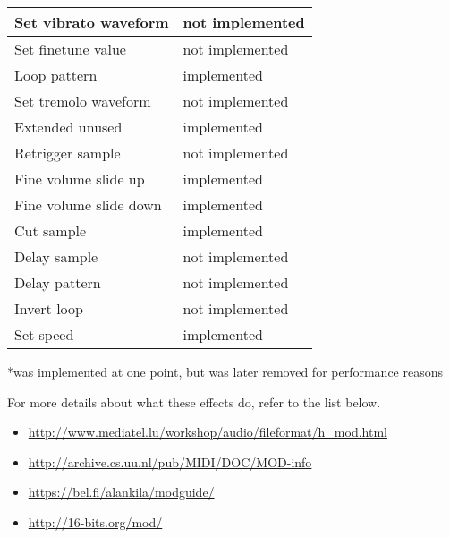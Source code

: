 \begin{table}[H]
\begin{tabular}{|l|l|}
        Set vibrato waveform & not implemented \\
        \hline
        Set finetune value & not implemented \\
        \hline
        Loop pattern & implemented \\
        \hline
        Set tremolo waveform & not implemented \\
        \hline
        Extended unused & implemented \\
        \hline
        Retrigger sample & not implemented \\
        \hline
        Fine volume slide up & implemented \\
        \hline
        Fine volume slide down & implemented \\
        \hline
        Cut sample & implemented \\
        \hline
        Delay sample & not implemented \\
        \hline
        Delay pattern & not implemented \\
        \hline
        Invert loop & not implemented \\
        \hline
        Set speed & implemented
    \end{tabular}
    \label{libmodam-feats}
\end{table}
*was implemented at one point, but was later removed for performance reasons


For more details about what these effects do, refer to the list below.
\begin{itemize}
    \item{\url{http://www.mediatel.lu/workshop/audio/fileformat/h_mod.html}}
    \item{\url{http://archive.cs.uu.nl/pub/MIDI/DOC/MOD-info}}
    \item{\url{https://bel.fi/alankila/modguide/}}
    \item{\url{http://16-bits.org/mod/}}
\end{itemize}
